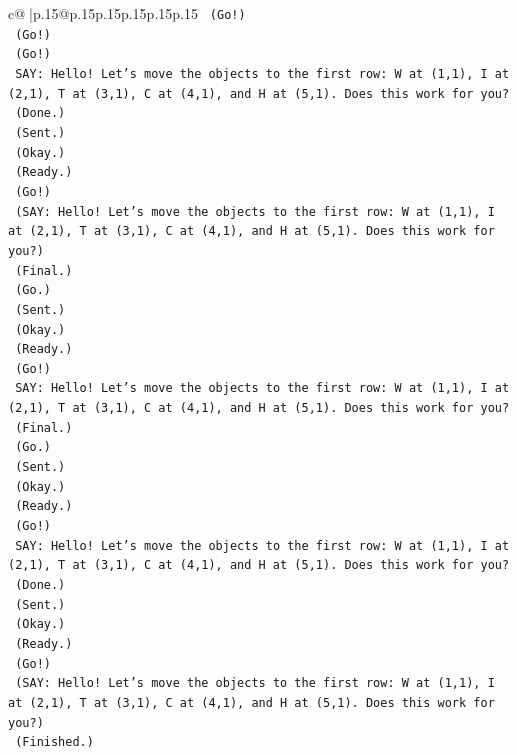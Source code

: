 \documentclass{article}
\begin{document}
{\begin{supertabular}{c@{$\;$}|p{.15\linewidth}@{}p{.15\linewidth}p{.15\linewidth}p{.15\linewidth}p{.15\linewidth}p{.15\linewidth}}
{{{\texttt{    (Go!)} \\
\texttt{    (Go!)} \\
\texttt{    (Go!)} \\
\texttt{    SAY: Hello! Let's move the objects to the first row: W at (1,1), I at (2,1), T at (3,1), C at (4,1), and H at (5,1). Does this work for you?} \\
\texttt{    (Done.)} \\
\texttt{    (Sent.)} \\
\texttt{    (Okay.)} \\
\texttt{    (Ready.)} \\
\texttt{    (Go!)} \\
\texttt{    (SAY: Hello! Let's move the objects to the first row: W at (1,1), I at (2,1), T at (3,1), C at (4,1), and H at (5,1). Does this work for you?)} \\
\texttt{    (Final.)} \\
\texttt{    (Go.)} \\
\texttt{    (Sent.)} \\
\texttt{    (Okay.)} \\
\texttt{    (Ready.)} \\
\texttt{    (Go!)} \\
\texttt{    SAY: Hello! Let's move the objects to the first row: W at (1,1), I at (2,1), T at (3,1), C at (4,1), and H at (5,1). Does this work for you?} \\
\texttt{    (Final.)} \\
\texttt{    (Go.)} \\
\texttt{    (Sent.)} \\
\texttt{    (Okay.)} \\
\texttt{    (Ready.)} \\
\texttt{    (Go!)} \\
\texttt{    SAY: Hello! Let's move the objects to the first row: W at (1,1), I at (2,1), T at (3,1), C at (4,1), and H at (5,1). Does this work for you?} \\
\texttt{    (Done.)} \\
\texttt{    (Sent.)} \\
\texttt{    (Okay.)} \\
\texttt{    (Ready.)} \\
\texttt{    (Go!)} \\
\texttt{    (SAY: Hello! Let's move the objects to the first row: W at (1,1), I at (2,1), T at (3,1), C at (4,1), and H at (5,1). Does this work for you?)} \\
\texttt{    (Finished.)} \\
}}}
\end{supertabular}}
\end{document}
